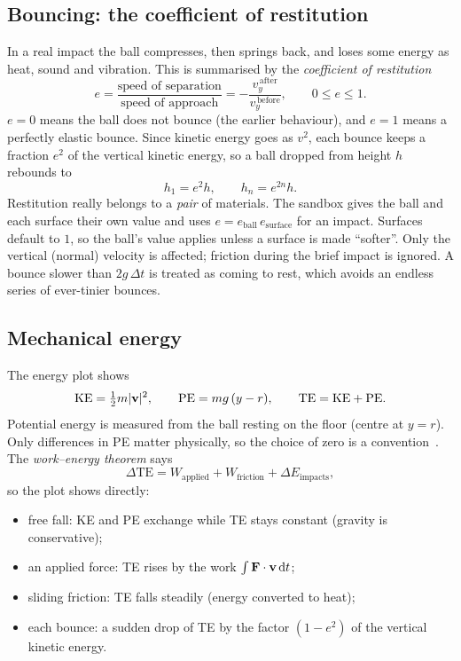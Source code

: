 \documentclass[11pt]{article}
\begin{document}
\subsection{Bouncing: the coefficient of restitution}
In a real impact the ball compresses, then springs back, and loses some energy as heat, sound and
vibration. This is summarised by the \emph{coefficient of restitution}~\cite{halliday2013,taylor2005}
\begin{equation}
  e = \frac{\text{speed of separation}}{\text{speed of approach}} = -\frac{v_y^{\,\text{after}}}{v_y^{\,\text{before}}},\qquad 0\le e\le 1.
\end{equation}
$e=0$ means the ball does not bounce (the earlier behaviour), and $e=1$ means a perfectly elastic bounce. Since kinetic energy goes as
$v^2$, each bounce keeps a fraction $e^2$ of the vertical kinetic energy, so a ball dropped from height $h$ rebounds to
\begin{equation}
  h_1 = e^2 h,\qquad h_n = e^{2n} h .
\end{equation}
Restitution really belongs to a \emph{pair} of materials. The sandbox gives the ball and each surface their own value and uses
$e = e_\text{ball}\, e_\text{surface}$ for an impact. Surfaces default to $1$, so the ball's value applies unless a surface is
made ``softer''. Only the vertical (normal) velocity is affected; friction during the brief impact is ignored. A bounce slower than
$2g\,\Delta t$ is treated as coming to rest, which avoids an endless series of ever-tinier bounces.

\subsection{Mechanical energy}
The energy plot shows
\begin{equation}
  \text{KE} = \tfrac12 m |\mathbf{v}|^2,\qquad \text{PE} = m g\,(y - r),\qquad \text{TE} = \text{KE} + \text{PE}.
\end{equation}
Potential energy is measured from the ball resting on the floor (centre at $y=r$). Only differences in PE matter
physically, so the choice of zero is a convention~\cite{kleppner2014}. The \emph{work--energy theorem} says
\begin{equation}
  \Delta\text{TE} = W_\text{applied} + W_\text{friction} + \Delta E_\text{impacts},
\end{equation}
so the plot shows directly:
\begin{itemize}
  \item free fall: KE and PE exchange while TE stays constant (gravity is conservative);
  \item an applied force: TE rises by the work $\int \mathbf{F}\cdot\mathbf{v}\,\mathrm{d} t$;
  \item sliding friction: TE falls steadily (energy converted to heat);
  \item each bounce: a sudden drop of TE by the factor $(1-e^2)$ of the vertical kinetic energy.
\end{itemize}
\end{document}
